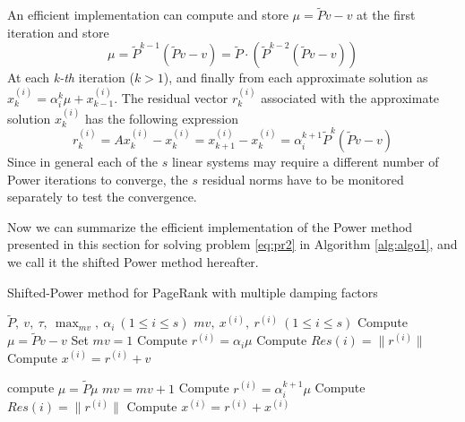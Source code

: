 \documentclass[12pt]{article}
\begin{document}
\noindent An efficient implementation can compute and store $\mu = \tilde Pv -v$ at the first iteration and store
$$\mu = \tilde P^{k-1}(\tilde P v - v) = \tilde P \cdot (\tilde P^{k-2}(\tilde P v - v))$$
At each \emph{k-th} iteration ($k  > 1$), and finally from each approximate solution as $x_k^{(i)} = \alpha_i^k \mu + x_{k-1}^{(i)}$. The residual vector $r_k^{(i)}$ associated with the approximate solution $x_k^{(i)}$ has the following expression
\begin{equation}
    r_k^{(i)} = A x_k^{(i)} - x_k^{(i)} = x_{k+1}^{(i)} - x_k^{(i)} = \alpha_i^{k+1} \tilde P^k (\tilde P v - v)
\end{equation}
Since in general each of the $s$ linear systems may require a different number of Power iterations to converge, the $s$ residual norms have to be monitored separately to test the convergence. \vspace{0.4cm}

\noindent Now we can summarize the efficient implementation of the Power method presented in this section for solving problem \ref{eq:pr2} in Algorithm \ref{alg:algo1}, and we call it the shifted Power method hereafter.

\begin{algorithm}\label{alg:algo1}
    \caption{Shifted-Power method for PageRank with multiple damping factors}\label{alg:algo1}
    \begin{algorithmic}
        \Require $\tilde P, ~v, ~\tau, ~\max_{mv}, ~\alpha_i ~ (1 \leq i \leq s)$
        \Ensure $mv,~ x^{(i)},~ r^{(i)} ~ (1 \leq i \leq s)$
        \State Compute $\mu = \tilde P v - v$
        \State Set $mv =1$
            \State Compute $r^{(i)} = \alpha_i \mu$
            \State Compute $Res(i) = \lVert r^{(i)} \rVert$
                \State Compute $x^{(i)} = r^{(i)} + v$
            \EndIf
        \EndFor

            \State compute $\mu = \tilde P \mu$
            \State $mv = mv + 1$
                    \State Compute $r^{(i)} = \alpha_i^{k+1} \mu$
                    \State Compute $Res(i) = \lVert r^{(i)} \rVert$
                        \State Compute $x^{(i)} = r^{(i)} + x^{(i)}$
                    \EndIf
                \EndIf
            \EndFor
        \EndWhile
    \end{algorithmic}
\end{algorithm}
\end{document}
